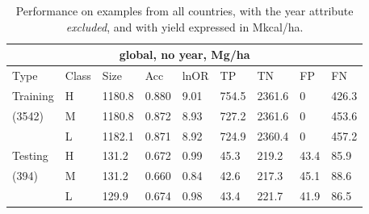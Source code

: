 \documentclass[11pt]{article}
\begin{document}
\begin{table}[h!]
\centering
\begin{tabular}{lllllllll}
\toprule
\multicolumn{9}{c}{\textbf{global, no year, Mg/ha}} \\
\midrule
Type & Class & Size & Acc & lnOR & TP & TN & FP & FN \\
\midrule
Training & H & 1180.8 & 0.880 & 9.01 & 754.5 & 2361.6 & 0 & 426.3  \\
(3542) & M & 1180.8 & 0.872 & 8.93 & 727.2 & 2361.6 & 0 & 453.6  \\
& L & 1182.1 & 0.871 & 8.92 & 724.9 & 2360.4 & 0 & 457.2  \\
Testing & H & 131.2 & 0.672 & 0.99 & 45.3 & 219.2 & 43.4 & 85.9 \\
(394) & M & 131.2 & 0.660 & 0.84 & 42.6 & 217.3 & 45.1 & 88.6 \\
& L & 129.9 & 0.674 & 0.98 & 43.4 & 221.7 & 41.9 & 86.5 \\
\bottomrule
\end{tabular}
\caption{Performance on examples from all countries, with the year attribute \emph{excluded}, and with yield expressed in Mkcal/ha.}
\label{t.ny.wt_results}
\end{table}

\end{document}
